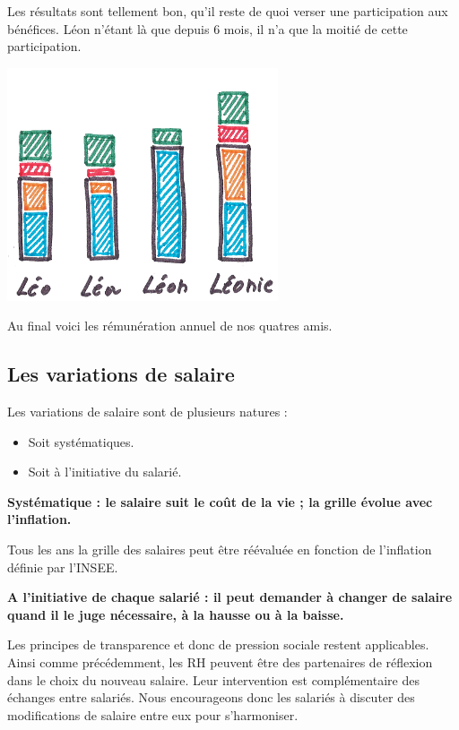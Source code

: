 \documentclass[12pt]{article}
\newcommand{\regle}[1]{%
  \begin{tcolorbox}[colframe=DarkOrange,boxrule=2pt,arc=4pt,left=6pt,right=6pt,top=6pt,bottom=6pt,boxsep=0pt,colback=LightOrange]
  \textbf{#1}
  \end{tcolorbox}
}
\begin{document}
 Les résultats sont tellement bon, qu’il reste de quoi verser une participation aux bénéfices. Léon n’étant là que depuis 6 mois, il n’a que la moitié de cette participation.

 \begin{center}
 \includegraphics[width=0.6\textwidth]{includes/remuneration}
 \end{center}
 Au final voici les rémunération annuel de nos quatres amis.

\subsection{Les variations de salaire}
\label{sec.variation-salaire}
 Les variations de salaire sont de plusieurs natures : 
 \begin{itemize}
   \item Soit systématiques.
   \item Soit à l’initiative du salarié.
 \end{itemize}

 \vspace{3mm}
 \regle{Systématique : le salaire suit le coût de la vie ; la grille évolue avec l’inflation.}

 Tous les ans la grille des salaires peut être réévaluée en fonction de l’inflation définie par l’INSEE.

 \regle{A l'initiative de chaque salarié : il peut demander à changer de salaire quand il le juge nécessaire, à la hausse ou à la baisse.}

 Les principes de transparence et donc de pression sociale restent applicables. Ainsi comme précédemment, les RH peuvent être des partenaires de réflexion dans le choix du nouveau salaire. Leur intervention est complémentaire des échanges entre salariés. Nous encourageons donc les salariés à discuter des modifications de salaire entre eux pour s’harmoniser. 
\end{document}
